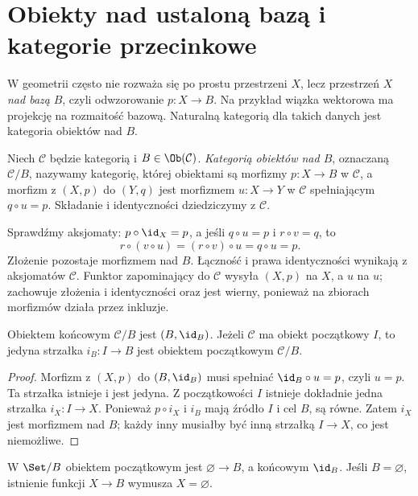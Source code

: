 \section{Obiekty nad ustaloną bazą i kategorie przecinkowe}\label{sec:slice}

W geometrii często nie rozważa się po prostu przestrzeni $X$, lecz przestrzeń $X$ \emph{nad bazą} $B$, czyli odwzorowanie $p:X\to B$. Na przykład wiązka wektorowa ma projekcję na rozmaitość bazową. Naturalną kategorią dla takich danych jest kategoria obiektów nad $B$.

\begin{definicja}\label{def:slice}
Niech $\mathcal C$ będzie kategorią i $B\in\Ob(\mathcal C)$. \emph{Kategorią obiektów nad $B$}, oznaczaną $\mathcal C/B$, nazywamy kategorię, której obiektami są morfizmy $p:X\to B$ w $\mathcal C$, a morfizm z $(X,p)$ do $(Y,q)$ jest morfizmem $u:X\to Y$ w $\mathcal C$ spełniającym $q\circ u=p$. Składanie i identyczności dziedziczymy z $\mathcal C$.
\end{definicja}

Sprawdźmy aksjomaty: $p\circ\id_X=p$, a jeśli $q\circ u=p$ i $r\circ v=q$, to
\[
r\circ(v\circ u)=(r\circ v)\circ u=q\circ u=p.
\]
Złożenie pozostaje morfizmem nad $B$. Łączność i prawa identyczności wynikają z aksjomatów $\mathcal C$. Funktor zapominający do $\mathcal C$ wysyła $(X,p)$ na $X$, a $u$ na $u$; zachowuje złożenia i identyczności oraz jest wierny, ponieważ na zbiorach morfizmów działa przez inkluzje.

\begin{stwierdzenie}\label{cat:prop:slice-initial-terminal}
Obiektem końcowym $\mathcal C/B$ jest $(B,\id_B)$. Jeżeli $\mathcal C$ ma obiekt początkowy $I$, to jedyna strzałka $i_B:I\to B$ jest obiektem początkowym $\mathcal C/B$.
\end{stwierdzenie}
\begin{proof}
Morfizm z $(X,p)$ do $(B,\id_B)$ musi spełniać $\id_B\circ u=p$, czyli $u=p$. Ta strzałka istnieje i jest jedyna. Z początkowości $I$ istnieje dokładnie jedna strzałka $i_X:I\to X$. Ponieważ $p\circ i_X$ i $i_B$ mają źródło $I$ i cel $B$, są równe. Zatem $i_X$ jest morfizmem nad $B$; każdy inny musiałby być inną strzałką $I\to X$, co jest niemożliwe.
\end{proof}

\begin{przyklad}
W $\Set/B$ obiektem początkowym jest $\varnothing\to B$, a końcowym $\id_B$. Jeśli $B=\varnothing$, istnienie funkcji $X\to B$ wymusza $X=\varnothing$.
\end{przyklad}

